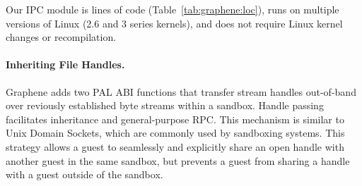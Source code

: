 Our IPC module is \gipclines{} lines of code (Table~\ref{tab:graphene:loc}), 
runs on multiple versions of Linux (2.6 and 3 series kernels), and
does not require
Linux kernel changes or recompilation.


\begin{comment}
A critical challenge in developing a Linux library OS was implementing 
handle inheritance in the guest.  In some cases, 
handles are easy to reproduce: an open file can simply be reopened in the child,
and the cursor offset adjusted (note that file handle offsets are a library abstraction
implemented over a memory mapped file).
Pipes, however, are not easily recreated without host support.
\end{comment}

\paragraph{Inheriting File Handles.}
Graphene adds two PAL ABI functions that transfer 
stream handles out-of-band over reviously 
established byte streams within a sandbox.  Handle passing facilitates inheritance
and general-purpose RPC.
This mechanism is similar to Unix Domain Sockets,
which are commonly used by sandboxing systems. %
This strategy allows a guest to seamlessly and explicitly 
share an open handle with another guest in the same sandbox, but prevents
a guest from sharing a handle with a guest outside of the sandbox.

